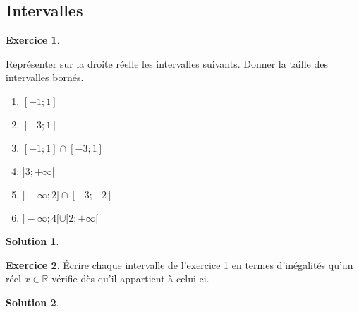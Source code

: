 \documentclass[a4paper, 14pt]{extarticle}
\theoremstyle{plain}
\newtheorem*{sol}{Solution}
\theoremstyle{definition}
\newtheorem{ex}{Exercice}
\newcommand{\R}{\mathbb{R}}
\newif\ifsolutions
\newcommand{\exe}[2]{
		\begin{ex} #1  \end{ex}
		\begin{sol} #2 \end{sol}
	}
\newcommand{\exe}[2]{
		\begin{ex} #1  \end{ex}
	}
\begin{document}
\pagestyle{fancy}
\fancyhead[C]{\textbf{ Droite réelle \ifsolutions -- Solutions  \fi}}
\fancyhead[R]{\today}

\subsection*{Intervalles}

\begin{center}
	
\end{center}

\exe{\label{ex:1}


	Représenter sur la droite réelle les intervalles suivants. Donner la taille des intervalles bornés.
	\begin{multicols}{2}
	\begin{enumerate}
		\item $[-1 ; 1]$
		\item $[-3 ; 1]$
		\item $[-1 ; 1] \cap [-3 ; 1]$
		\item $]3 ; +\infty [$
		\item $] - \infty ; 2] \cap [-3 ; -2]$
		\item $]- \infty ; 4 [ \cup [2 ; +\infty[$
	\end{enumerate}
	\end{multicols}
	
	
}
{}


\begin{center}
\end{center}


\exe{
	Écrire chaque intervalle de l'exercice \ref{ex:1} en termes d'inégalités qu'un réel $x \in \R$ vérifie dès qu'il appartient à celui-ci.
}
{}
\end{document}
